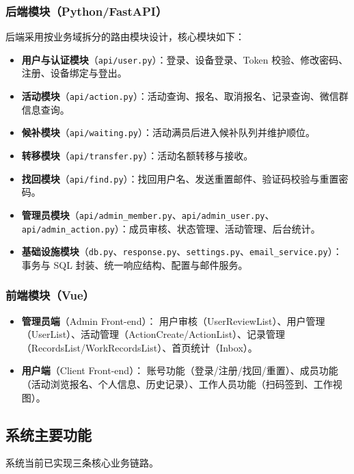 \subsubsection{后端模块（Python/FastAPI）}

后端采用按业务域拆分的路由模块设计，核心模块如下：
\begin{itemize}
  \item \textbf{用户与认证模块}（\texttt{api/user.py}）：登录、设备登录、Token 校验、修改密码、注册、设备绑定与登出。
  \item \textbf{活动模块}（\texttt{api/action.py}）：活动查询、报名、取消报名、记录查询、微信群信息查询。
  \item \textbf{候补模块}（\texttt{api/waiting.py}）：活动满员后进入候补队列并维护顺位。
  \item \textbf{转移模块}（\texttt{api/transfer.py}）：活动名额转移与接收。
  \item \textbf{找回模块}（\texttt{api/find.py}）：找回用户名、发送重置邮件、验证码校验与重置密码。
  \item \textbf{管理员模块}（\texttt{api/admin\_member.py}、\texttt{api/admin\_user.py}、\texttt{api/admin\_action.py}）：成员审核、状态管理、活动管理、后台统计。
  \item \textbf{基础设施模块}（\texttt{db.py}、\texttt{response.py}、\texttt{settings.py}、\texttt{email\_service.py}）：事务与 SQL 封装、统一响应结构、配置与邮件服务。
\end{itemize}

\subsubsection{前端模块（Vue）}

\begin{itemize}
  \item \textbf{管理员端}（Admin Front-end）：
  用户审核（UserReviewList）、用户管理（UserList）、活动管理（ActionCreate/ActionList）、记录管理（RecordsList/WorkRecordsList）、首页统计（Inbox）。
  \item \textbf{用户端}（Client Front-end）：
  账号功能（登录/注册/找回/重置）、成员功能（活动浏览报名、个人信息、历史记录）、工作人员功能（扫码签到、工作视图）。
\end{itemize}

\subsection{系统主要功能}

系统当前已实现三条核心业务链路。

